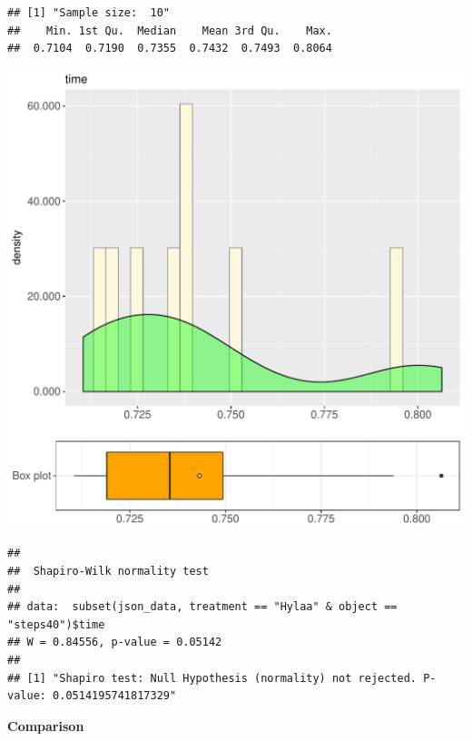 \documentclass{article}\usepackage[]{graphicx}\usepackage[]{color}
\makeatletter
\def\maxwidth{ %
  \ifdim\Gin@nat@width>\linewidth
    \linewidth
  \else
    \Gin@nat@width
  \fi
}
\newenvironment{kframe}{%
 \def\at@end@of@kframe{}%
 \ifinner\ifhmode%
  \def\at@end@of@kframe{\end{minipage}}%
  \begin{minipage}{\columnwidth}%
 \fi\fi%
 \def\FrameCommand##1{\hskip\@totalleftmargin \hskip-\fboxsep
 \colorbox{shadecolor}{##1}\hskip-\fboxsep
     \hskip-\linewidth \hskip-\@totalleftmargin \hskip\columnwidth}%
 \MakeFramed {\advance\hsize-\width
   \@totalleftmargin\z@ \linewidth\hsize
   \@setminipage}}%
 {\par\unskip\endMakeFramed%
 \at@end@of@kframe}
\newenvironment{knitrout}{}{} %
\makeatother
\begin{document}
\begin{knitrout}
\color{fgcolor}\begin{kframe}
\begin{verbatim}
## [1] "Sample size:  10"
##    Min. 1st Qu.  Median    Mean 3rd Qu.    Max. 
##  0.7104  0.7190  0.7355  0.7432  0.7493  0.8064
\end{verbatim}
\end{kframe}
\includegraphics[width=\maxwidth]{figure/RH2_Hylaa_steps40-1} 
\begin{kframe}\begin{verbatim}
## 
## 	Shapiro-Wilk normality test
## 
## data:  subset(json_data, treatment == "Hylaa" & object == "steps40")$time
## W = 0.84556, p-value = 0.05142
## 
## [1] "Shapiro test: Null Hypothesis (normality) not rejected. P-value: 0.0514195741817329"
\end{verbatim}
\end{kframe}
\end{knitrout}
  
 \textbf{Comparison}
  
\end{document}
